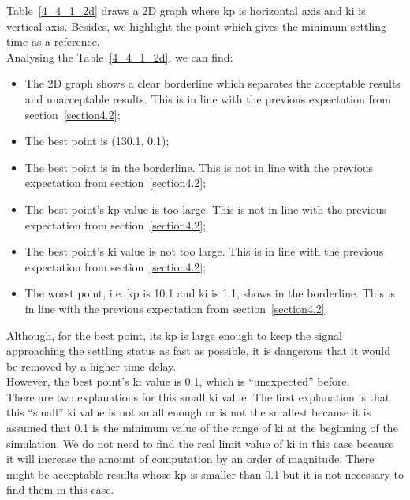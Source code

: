 Table~\ref{4_4_1_2d} draws a 2D graph where kp is horizontal axis and ki is vertical axis. Besides, we highlight the point which gives the minimum settling time as a reference.\\

Analysing the Table~\ref{4_4_1_2d}, we can find:\\

\begin{itemize}
\item The 2D graph shows a clear borderline which separates the acceptable results and unacceptable results. This is in line with the previous expectation from section~\ref{section4.2};\\

\item The best point is (130.1, 0.1);\\

\item The best point is in the borderline.  This is not in line with the previous expectation from section~\ref{section4.2};\\

\item The best point’s kp value is too large. This is not in line with the previous expectation from section~\ref{section4.2};\\

\item The best point's ki value is not too large.  This is in line with the previous expectation from section~\ref{section4.2};\\

\item The worst point, i.e. kp is 10.1 and ki is 1.1, shows in the borderline. This is in line with the previous expectation from section~\ref{section4.2}.\\
\end{itemize}

Although, for the best point, its kp is large enough to keep the signal approaching the settling status as fast as possible, it is dangerous that it would be removed by a higher time delay.\\

However, the best point's ki value is 0.1, which is “unexpected” before. \\

There are two explanations for this small ki value. The first explanation is that this “small” ki value is not small enough or is not the smallest because it is assumed that 0.1 is the minimum value of the range of ki at the beginning of the simulation. We do not need to find the real limit value of ki in this case because it will increase the amount of computation by an order of magnitude. There might be acceptable results whose kp is smaller than 0.1 but it is not necessary to find them in this case. \\

